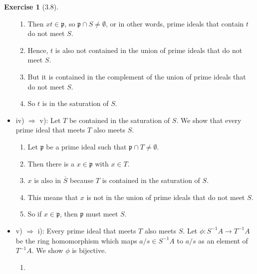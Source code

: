 \documentclass{book}
\theoremstyle{plain}
\theoremstyle{definition}
\newtheorem{exercise}[theorem]{Exercise}
\theoremstyle{custom_definition}
\begin{document}
\begin{exercise}[3.8]
\begin{itemize}
\begin{enumerate}
            \item Then \(xt \in \mathfrak{p}\), so \(\mathfrak{p} \cap S \neq \emptyset\), or in other words, prime ideals that contain \(t\) do not meet \(S\).
            \item Hence, \(t\) is also not contained in the union of prime ideals that do not meet \(S\).
            \item But it is contained in the complement of the union of prime ideals that do not meet \(S\).
            \item So \(t\) is in the saturation of \(S\).
        \end{enumerate}
        \item iv) \(\Rightarrow\) v): Let \(T\) be contained in the saturation of \(S\). We show that every prime ideal that meets \(T\) also meets \(S\).
        \begin{enumerate}
            \item Let \(\mathfrak{p}\) be a prime ideal such that \(\mathfrak{p} \cap T \neq \emptyset\).
            \item Then there is a \(x \in \mathfrak{p}\) with \(x \in T\).
            \item \(x\) is also in \(\overline{S}\) because \(T\) is contained in the saturation of \(S\).
            \item This means that \(x\) is not in the union of prime ideals that do not meet \(S\).
            \item So if \(x \in \mathfrak{p}\), then \(\mathfrak{p}\) must meet \(S\).
        \end{enumerate}
        \item v) \(\Rightarrow\) i): Every prime ideal that meets \(T\) also meets \(S\). Let \(\phi: S^{-1}A \longrightarrow T^{-1}A\) be the ring homomorphism which maps \(a/s \in S^{-1}A\) to \(a/s\) as an element of \(T^{-1}A\). We show \(\phi\) is bijective.
        \begin{enumerate}
            \item 
        \end{enumerate}
    \end{itemize}
\end{exercise}
\end{document}
